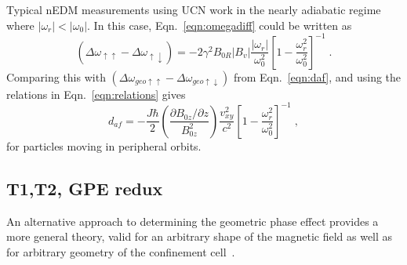 Typical nEDM measurements using UCN work in the nearly adiabatic
regime where $|\omega_r| < |\omega_0|$.  In this case,
Eqn.~\ref{eqn:omegadiff} could be written as
%
\begin{equation}
(\Delta \omega_{\uparrow\uparrow} - \Delta \omega_{\uparrow\downarrow}) = -2\gamma^2 B_{0R} |B_{v}| \frac{|\omega_r|}{\omega_0^2} \left[1-\frac{\omega_r^2}{\omega_0^2}\right]^{-1} \;.
\end{equation}
%
Comparing this with
$(\Delta \omega_{geo\uparrow\uparrow} - \Delta
\omega_{geo\uparrow\downarrow})$ from Eqn.~\ref{eqn:daf}, and using
the relations in Eqn.~\ref{eqn:relations} gives
%
\begin{equation}
d_{af} = -\frac{J \hbar}{2} \left( \frac{\partial B_{0z} / \partial z}{B_{0z}^2} \right) \frac{v_{xy}^2}{c^2} \left[1-\frac{\omega_r^2}{\omega_0^2}\right]^{-1} \; ,
\end{equation}
%
for particles moving in peripheral orbits.

\subsection{T1,T2, GPE redux}

An alternative approach to determining the geometric phase effect
provides a more general theory, valid for an arbitrary shape of the
magnetic field as well as for arbitrary geometry of the confinement
cell~\cite{pignol2012electric}.

